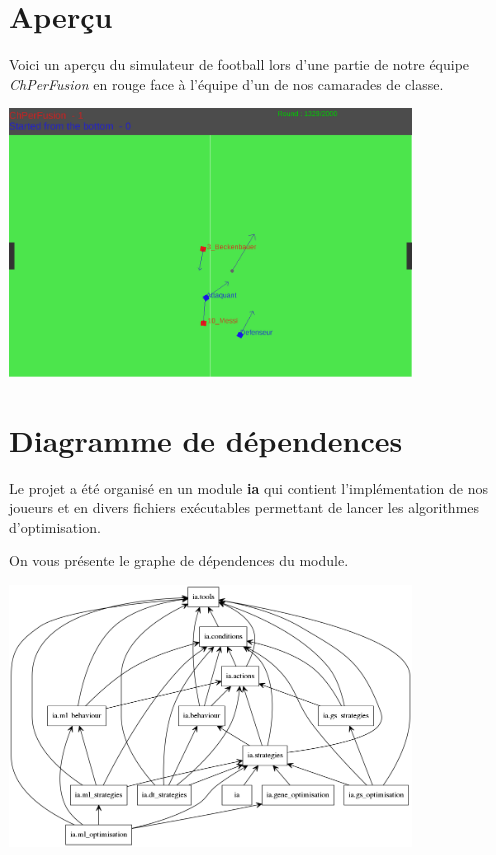 \documentclass[12pt,a4paper]{article}
\begin{document}
\section*{Aper\c{c}u}
Voici un aper\c{c}u du simulateur de football lors d'une partie de notre 
\'equipe {\itshape ChPerFusion} en rouge face \`a l'\'equipe d'un de nos 
camarades de classe.

\begin{center}
\includegraphics[width=0.8\textwidth]{apercu.png}\par%
\end{center}

\section*{Diagramme de d\'ependences}
Le projet a \'et\'e organis\'e en un module {\bfseries ia} qui contient 
l'impl\'ementation de nos joueurs et en divers fichiers ex\'ecutables 
permettant de lancer les algorithmes d'optimisation.

On vous pr\'esente le graphe de d\'ependences du module.

\begin{center}
  \includegraphics[width=0.8\textwidth]{packages_IA.png}\par%
\end{center}
\end{document}
